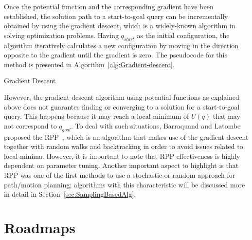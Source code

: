 Once the potential function and the corresponding gradient have been
established, the solution path to a start-to-goal query can be incrementally
obtained by using the gradient descent, which is a widely-known algorithm in
solving optimization problems. Having $q_{start}$ as the initial configuration,
the algorithm iteratively calculates a new configuration by moving in the
direction opposite to the gradient until the gradient is zero. The pseudocode
for this method is presented in Algorithm~\ref{alg:Gradient-descent}.

\begin{algorithm}[htbp]
	\DontPrintSemicolon


 \caption{Gradient Descent}
 \label{alg:Gradient-descent}
\end{algorithm}

However, the gradient descent algorithm using potential functions as explained
above does not guarantee finding or converging to a solution for a start-to-goal
query. This happens because it may reach a local minimum of $U(q)$ that may not
correspond to $q_{goal}$. To deal with such situations, Barraquand and Latombe
proposed the \ac{RPP}~\cite{Barraquand1990, Barraquand1991}, which is an
algorithm that makes use of the gradient descent together with random walks and
backtracking in order to avoid issues related to local minima. However, it is
important to note that \ac{RPP} effectiveness is highly dependent on parameter
tuning. Another important aspect to highlight is that \ac{RPP} was one of the
first methods to use a stochastic or random approach for path/motion planning;
algorithms with this characteristic will be discussed more in detail in
Section~\ref{sec:SamplingBasedAlg}.

\section{Roadmaps}
\label{sec:Roadmaps}

